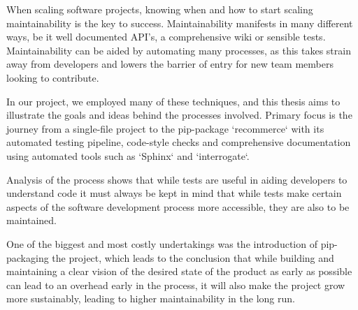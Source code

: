 When scaling software projects, knowing when and how to start scaling maintainability is the key to success.
Maintainability manifests in many different ways, be it well documented API's, a comprehensive wiki or sensible tests.
Maintainability can be aided by automating many processes, as this takes strain away from developers and
lowers the barrier of entry for new team members looking to contribute.

In our project, we employed many of these techniques, and this thesis aims to illustrate the goals and ideas behind
the processes involved. Primary focus is the journey from a single-file project to the pip-package `recommerce`
with its automated testing pipeline, code-style checks and comprehensive documentation using automated tools such as 
`Sphinx` and `interrogate`.

Analysis of the process shows that while tests are useful in aiding developers to understand code it must always be
kept in mind that while tests make certain aspects of the software development process more accessible, they are
also to be maintained.

One of the biggest and most costly undertakings was the introduction of pip-packaging the project, which leads
to the conclusion that while building and maintaining a clear vision of the desired state of the product as early as possible
can lead to an overhead early in the process, it will also make the project grow more sustainably, leading to higher
maintainability in the long run.